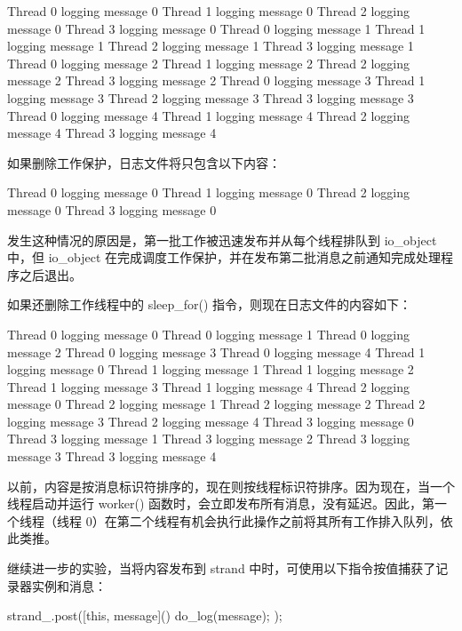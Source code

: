 \begin{shell}
Thread 0 logging message 0
Thread 1 logging message 0
Thread 2 logging message 0
Thread 3 logging message 0
Thread 0 logging message 1
Thread 1 logging message 1
Thread 2 logging message 1
Thread 3 logging message 1
Thread 0 logging message 2
Thread 1 logging message 2
Thread 2 logging message 2
Thread 3 logging message 2
Thread 0 logging message 3
Thread 1 logging message 3
Thread 2 logging message 3
Thread 3 logging message 3
Thread 0 logging message 4
Thread 1 logging message 4
Thread 2 logging message 4
Thread 3 logging message 4
\end{shell}

如果删除工作保护，日志文件将只包含以下内容：

\begin{shell}
Thread 0 logging message 0
Thread 1 logging message 0
Thread 2 logging message 0
Thread 3 logging message 0
\end{shell}

发生这种情况的原因是，第一批工作被迅速发布并从每个线程排队到 io\_object 中，但 io\_object 在完成调度工作保护，并在发布第二批消息之前通知完成处理程序之后退出。

如果还删除工作线程中的 sleep\_for() 指令，则现在日志文件的内容如下：

\begin{shell}
Thread 0 logging message 0
Thread 0 logging message 1
Thread 0 logging message 2
Thread 0 logging message 3
Thread 0 logging message 4
Thread 1 logging message 0
Thread 1 logging message 1
Thread 1 logging message 2
Thread 1 logging message 3
Thread 1 logging message 4
Thread 2 logging message 0
Thread 2 logging message 1
Thread 2 logging message 2
Thread 2 logging message 3
Thread 2 logging message 4
Thread 3 logging message 0
Thread 3 logging message 1
Thread 3 logging message 2
Thread 3 logging message 3
Thread 3 logging message 4
\end{shell}

以前，内容是按消息标识符排序的，现在则按线程标识符排序。因为现在，当一个线程启动并运行 worker() 函数时，会立即发布所有消息，没有延迟。因此，第一个线程（线程 0）在第二个线程有机会执行此操作之前将其所有工作排入队列，依此类推。

继续进一步的实验，当将内容发布到 strand 中时，可使用以下指令按值捕获了记录器实例和消息：

\begin{cpp}
strand_.post([this, message]() { do_log(message); });
\end{cpp}

